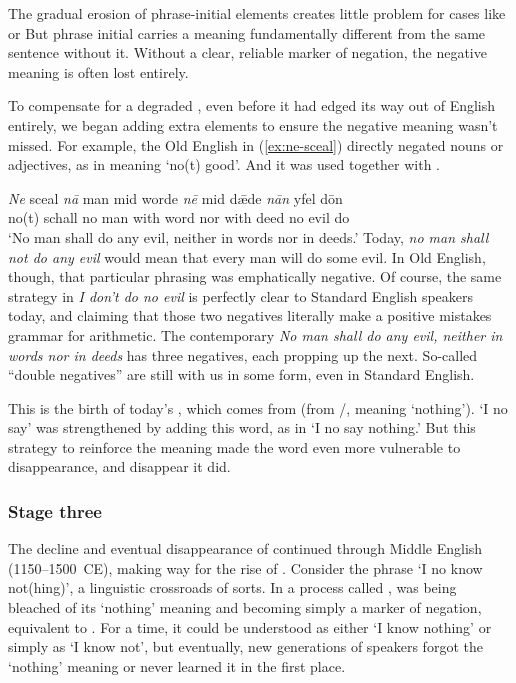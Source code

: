 The gradual erosion of phrase-initial elements creates little problem for cases like  or  But phrase initial  carries a meaning fundamentally different from the same sentence without it. Without a clear, reliable marker of negation, the negative meaning is often lost entirely.

To compensate for a degraded , even before it had edged its way out of English entirely, we began adding extra elements to ensure the negative meaning wasn't missed. For example, the Old English  in (\ref{ex:ne-sceal}) directly negated nouns or adjectives, as in  meaning `no(t) good'. And it was used together with .

\ea \label{ex:ne-sceal}
    \gll \emph{Ne} sceal \emph{nā} man mid worde \emph{nē} mid dǣde \emph{nān} yfel dōn  \\ no(t) schall no man with word nor with deed no evil do \\
    \trans `No man shall do any evil, neither in words nor in deeds.'
\z
Today, \textit{\emph{no} man shall \emph{not} do any evil} would mean that every man will do some evil. In Old English, though, that particular phrasing was emphatically negative. Of course, the same strategy in \textit{I \emph{don't} do \emph{no} evil} is perfectly clear to Standard English speakers today, and claiming that those two negatives literally make a positive mistakes grammar for arithmetic. The contemporary \textit{\emph{No} man shall do any evil, \emph{neither} in words \emph{nor} in deeds} has three negatives, each propping up the next. So-called \enquote{double negatives} are still with us in some form, even in Standard English.

This is the birth of today's , which comes from  (from /, meaning `nothing').   `I no say' was strengthened by adding this word, as in  `I no say nothing.' But this  strategy to reinforce the meaning made the word  even more vulnerable to disappearance, and disappear it did. 

\subsubsection*{Stage three}

The decline and eventual disappearance of  continued through Middle English (1150--1500~CE), making way for the rise of . Consider the phrase  `I no know not(hing)', a linguistic crossroads of sorts. In a process called ,  was being bleached of its `nothing' meaning and becoming simply a marker of negation, equivalent to . For a time, it could be understood as either `I know nothing' or simply as `I know not', but eventually, new generations of speakers forgot the `nothing' meaning or never learned it in the first place.

